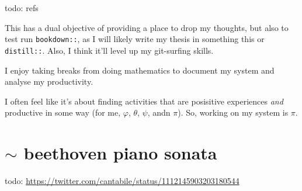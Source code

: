 \documentclass[]{book}
\begin{document}
todo: refs

This has a dual objective of providing a place to drop my thoughts, but also to test run \texttt{bookdown::}, as I will likely write my thesis in something this or \texttt{distill::}. Also, I think it'll level up my git-surfing skills.

I enjoy taking breaks from doing mathematics to document my system and analyse my productivity.

I often feel like it's about finding activities that are posisitive experiences \emph{and} productive in some way (for me, \(\varphi\), \(\theta\), \(\psi\), andn \(\pi\)). So, working on my system is \(\pi\).

\hypertarget{sim-beethoven-piano-sonata}{%
\section{\texorpdfstring{\(\sim\) beethoven piano sonata}{\textbackslash{}sim beethoven piano sonata}}\label{sim-beethoven-piano-sonata}}

todo:
\url{https://twitter.com/cantabile/status/1112145903203180544}


\end{document}
